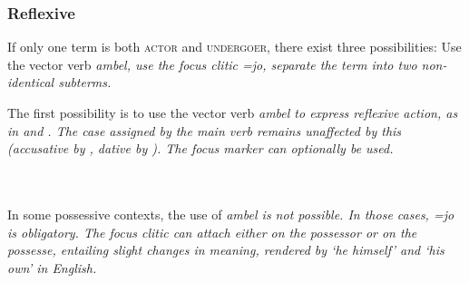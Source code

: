 
\subsubsection{Reflexive}\label{sec:func:Reflexive}
If only one term is both \textsc{actor} and \textsc{undergoer}, there exist three possibilities:  Use the vector verb \em ambel\em, use the focus clitic \em =jo\em, separate the term into two non-identical subterms.

The first possibility is to use the vector verb \em ambel \em to express reflexive action, as in  and . The case assigned by the main verb remains unaffected by this (accusative by , dative by ). The focus marker can optionally be used.


 \\

 \\

In some possessive contexts, the use of \em ambel \em is not possible. In those cases, \em =jo \em is obligatory. The focus clitic can attach either on the possessor or on the possesse, entailing slight changes in meaning, rendered by `he himself' and `his own' in English.



 \\

